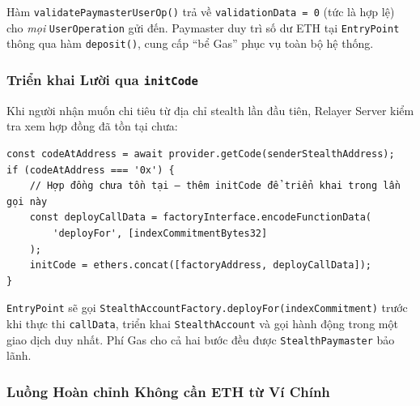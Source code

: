 \documentclass[../DoAn.tex]{subfiles}
\begin{document}
Hàm \texttt{validatePaymasterUserOp()} trả về \texttt{validationData = 0} (tức là hợp lệ) cho \textit{mọi} \texttt{UserOperation} gửi đến. Paymaster duy trì số dư ETH tại \texttt{EntryPoint} thông qua hàm \texttt{deposit()}, cung cấp ``bể Gas'' phục vụ toàn bộ hệ thống.

\subsubsection{Triển khai Lười qua \texttt{initCode}}

Khi người nhận muốn chi tiêu từ địa chỉ stealth lần đầu tiên, Relayer Server kiểm tra xem hợp đồng đã tồn tại chưa:

\begin{verbatim}
const codeAtAddress = await provider.getCode(senderStealthAddress);
if (codeAtAddress === '0x') {
    // Hợp đồng chưa tồn tại — thêm initCode để triển khai trong lần gọi này
    const deployCallData = factoryInterface.encodeFunctionData(
        'deployFor', [indexCommitmentBytes32]
    );
    initCode = ethers.concat([factoryAddress, deployCallData]);
}
\end{verbatim}

\texttt{EntryPoint} sẽ gọi \texttt{StealthAccountFactory.deployFor(indexCommitment)} trước khi thực thi \texttt{callData}, triển khai \texttt{StealthAccount} và gọi hành động trong một giao dịch duy nhất. Phí Gas cho cả hai bước đều được \texttt{StealthPaymaster} bảo lãnh.

\subsubsection{Luồng Hoàn chỉnh Không cần ETH từ Ví Chính}

\end{document}
